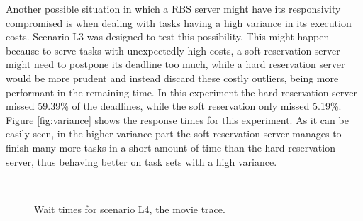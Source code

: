 \documentclass[times, 10pt,twocolumn]{article}
\begin{document}
Another possible situation in which a RBS server might have its
responsivity compromised is when dealing with tasks having a high
variance in its execution costs. Scenario L3 was designed to test this
possibility. This might happen because to serve tasks with
unexpectedly high costs, a soft reservation server might need to
postpone its deadline too much, while a hard reservation server would
be more prudent and instead discard these costly outliers, being more
performant in the remaining time. In this experiment the hard
reservation server missed 59.39\% of the deadlines, while the soft
reservation only missed 5.19\%. Figure \ref{fig:variance} shows the
response times for this experiment. As it can be easily seen, in the
higher variance part the soft reservation server manages to finish
many more tasks in a short amount of time than the hard reservation
server, thus behaving better on task sets with a high variance.

\begin{figure}[t]
  \centering
   \\
  \caption{Wait times for scenario L4, the movie trace.}
  \label{fig:eve}
\end{figure}
\end{document}

